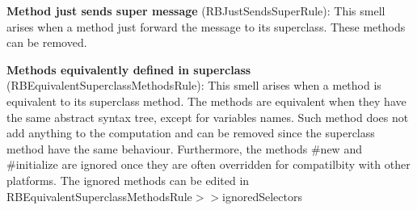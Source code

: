 \textbf{Method just sends super message} (RBJustSendsSuperRule): This smell arises when a method just forward the message to its superclass. These methods can be removed.

\textbf{Methods equivalently defined in superclass} (RBEquivalentSuperclassMethodsRule): This smell arises when a method is equivalent to its superclass method. The methods are equivalent when they have the same abstract syntax tree, except for variables names. Such method does not add anything to the computation and can be removed since the superclass method have the same behaviour. Furthermore, the methods \#new and \#initialize are ignored once they are often overridden for compatilbity with other platforms. The ignored methods can be edited in RBEquivalentSuperclassMethodsRule$>>$ignoredSelectors

